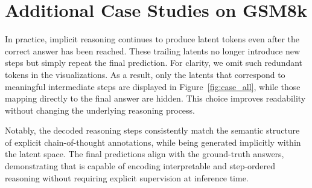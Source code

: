 \section{Additional Case Studies on GSM8k}
In practice, implicit reasoning continues to produce latent tokens even after the correct answer has been reached. These trailing latents no longer introduce new steps but simply repeat the final prediction. For clarity, we omit such redundant tokens in the visualizations. As a result, only the latents that correspond to meaningful intermediate steps are displayed in Figure~\ref{fig:case_all}, while those mapping directly to the final answer are hidden. This choice improves readability without changing the underlying reasoning process.

Notably, the decoded reasoning steps consistently match the semantic structure of explicit chain-of-thought annotations, while being generated implicitly within the latent space. The final predictions align with the ground-truth answers, demonstrating that \methodname is capable of encoding interpretable and step-ordered reasoning without requiring explicit supervision at inference time.  




